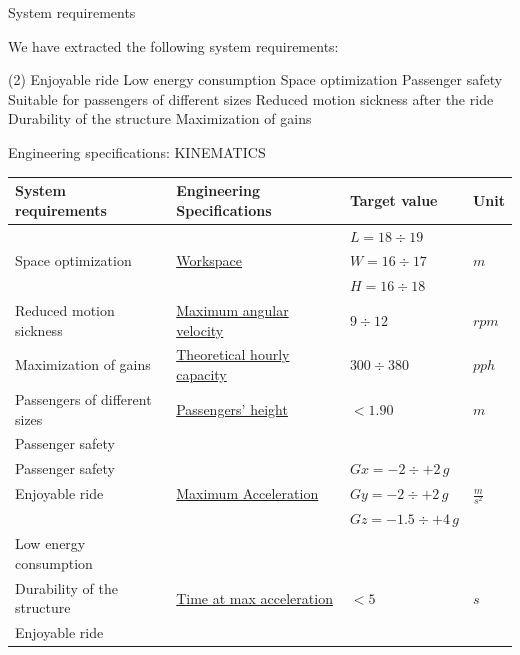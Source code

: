 \documentclass{beamer}              %
\begin{document}
	\begin{frame}{System requirements}
		\large 
		
		We have extracted the following system requirements:
	
		\bigskip
		
		\begin{tasks}(2)				
			\task Enjoyable ride					
			\task Low energy consumption
			\task Space optimization									
			\task Passenger safety
			\task Suitable for passengers of different sizes
			\task Reduced motion sickness after the ride
			\task Durability of the structure
			\task Maximization of gains 	    
		\end{tasks}	
	\end{frame}	
	\begin{frame}{Engineering specifications: KINEMATICS}
		\centering			
		
		\tiny	
		\begin{center}
			\begin{tabular}{p{2.8 cm} p{2.8 cm} p{2 cm} p{0.5 cm}}
				\toprule
				\textbf{System requirements}&\textbf{Engineering Specifications}  &\textbf{Target value} &\textbf{Unit} \\
				\toprule							
				& & $L=18\div19$ & \\ Space optimization & \hyperlink{1}{Workspace} & $W=16\div17$ & $m$ \\ & & $H=16\div18$ & \\
				\midrule				    
				Reduced motion sickness &\hyperlink{6}{Maximum angular velocity} & $9\div12$  & $rpm$  \\
				\midrule
				Maximization of gains & \hyperlink{7}{Theoretical hourly capacity} & $300 \div 380$ & $pph$   \\
				\midrule	      
				Passengers of different sizes & \hyperlink{8}{Passengers' height} & $<1.90$  & $m$  \\
				Passenger safety & & & \\
				\midrule
				Passenger safety &  & $Gx=-2\div+2\,g$&   \\
				Enjoyable ride& \hyperlink{3}{Maximum Acceleration}&$Gy=-2\div+2\,g$&$\frac{m}{s^{2}}$\\
				&&$Gz=-1.5\div+4\,g$&\\
				\midrule
				Low energy consumption& & & \\
				Durability of the structure & \hyperlink{5}{Time at max acceleration} & $<5$ &$s$\\
				Enjoyable ride & & &\\							
				\bottomrule
			\end{tabular}
		\end{center}	
	\end{frame}
\end{document}
